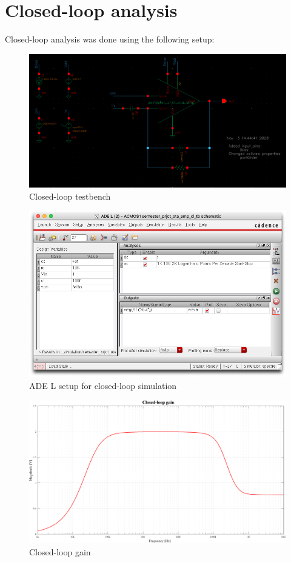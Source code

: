 \section{Closed-loop analysis}
Closed-loop analysis was done using the following setup:
\begin{figure}[h!]
    \centering
    \includegraphics[width=.9\linewidth]{Images/Virtuoso/CL_sch.png}
    \caption{Closed-loop testbench}
    \label{fig:cl:tb}
\end{figure}

\begin{figure}[h!]
    \centering
    \includegraphics[width=.9\linewidth]{Images/Virtuoso/ADE_cl.png}
    \caption{ADE L setup for closed-loop simulation}
    \label{fig:cl:ADE}
\end{figure}

\newpage
\null
\vfill
\begin{figure}[H]
    \centering
    \includegraphics[width=.87\linewidth]{Images/Simulations/closed_loop_gain.pdf}
    \caption{Closed-loop gain}
    \label{fig:cl:sim}
\end{figure}
\vfill